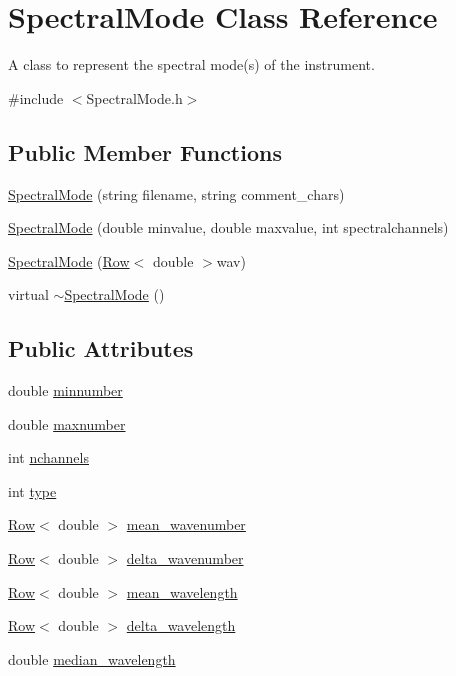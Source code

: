 \hypertarget{classSpectralMode}{
\section{SpectralMode Class Reference}
\label{classSpectralMode}
}


A class to represent the spectral mode(s) of the instrument.  




{\ttfamily \#include $<$SpectralMode.h$>$}

\subsection*{Public Member Functions}
\begin{DoxyCompactItemize}
\item 
\hyperlink{classSpectralMode_abfb56a691dd864cfc5f93357ee7a3eee}{SpectralMode} (string filename, string comment\_\-chars)
\item 
\hyperlink{classSpectralMode_abafb61f9ba5c980bf5db7ebcad116d57}{SpectralMode} (double minvalue, double maxvalue, int spectralchannels)
\item 
\hyperlink{classSpectralMode_a56d1476d403b85e1967948b5d6a77c71}{SpectralMode} (\hyperlink{classRow}{Row}$<$ double $>$wav)
\item 
virtual \hyperlink{classSpectralMode_a8f6ff593021e7d0e175b528c94896a6b}{$\sim$SpectralMode} ()
\end{DoxyCompactItemize}
\subsection*{Public Attributes}
\begin{DoxyCompactItemize}
\item 
double \hyperlink{classSpectralMode_a702eb517e9b821c6fc6508fa6b96579c}{minnumber}
\item 
double \hyperlink{classSpectralMode_aa0e01cba630aff89cf934470513e7f89}{maxnumber}
\item 
int \hyperlink{classSpectralMode_a7c68010a64d612a452df276003689eca}{nchannels}
\item 
int \hyperlink{classSpectralMode_a7720aa3a3f0d28c755169f86a3125d58}{type}
\item 
\hyperlink{classRow}{Row}$<$ double $>$ \hyperlink{classSpectralMode_ad32246c8a4ebe1bfdc7879849fa6fd6f}{mean\_\-wavenumber}
\item 
\hyperlink{classRow}{Row}$<$ double $>$ \hyperlink{classSpectralMode_a79cec2adab5afc8d84f09bd3f4a222d3}{delta\_\-wavenumber}
\item 
\hyperlink{classRow}{Row}$<$ double $>$ \hyperlink{classSpectralMode_af83f2181ef2b8660feac40e7691893d6}{mean\_\-wavelength}
\item 
\hyperlink{classRow}{Row}$<$ double $>$ \hyperlink{classSpectralMode_af4835d0dd1c5276798e400f3bcfa1bb7}{delta\_\-wavelength}
\item 
double \hyperlink{classSpectralMode_a8c817cc0d2f5d57823a03256743260b3}{median\_\-wavelength}
\end{DoxyCompactItemize}
